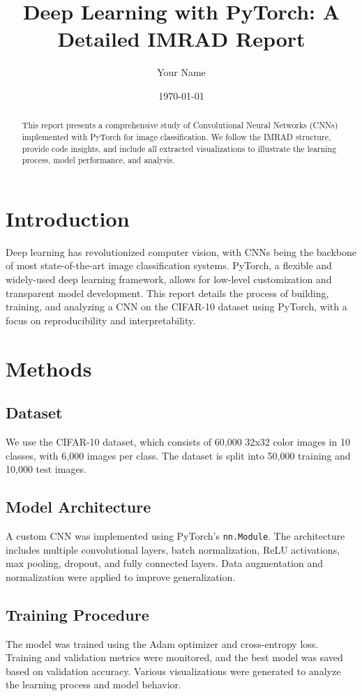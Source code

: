 \documentclass[12pt,a4paper]{article}
\title{Deep Learning with PyTorch: A Detailed IMRAD Report}
\author{Your Name}
\date{\today}
\begin{document}
\maketitle

\begin{abstract}
This report presents a comprehensive study of Convolutional Neural Networks (CNNs) implemented with PyTorch for image classification. We follow the IMRAD structure, provide code insights, and include all extracted visualizations to illustrate the learning process, model performance, and analysis.
\end{abstract}

\section{Introduction}
Deep learning has revolutionized computer vision, with CNNs being the backbone of most state-of-the-art image classification systems. PyTorch, a flexible and widely-used deep learning framework, allows for low-level customization and transparent model development. This report details the process of building, training, and analyzing a CNN on the CIFAR-10 dataset using PyTorch, with a focus on reproducibility and interpretability.

\section{Methods}
\subsection{Dataset}
We use the CIFAR-10 dataset, which consists of 60,000 32x32 color images in 10 classes, with 6,000 images per class. The dataset is split into 50,000 training and 10,000 test images.

\subsection{Model Architecture}
A custom CNN was implemented using PyTorch's \texttt{nn.Module}. The architecture includes multiple convolutional layers, batch normalization, ReLU activations, max pooling, dropout, and fully connected layers. Data augmentation and normalization were applied to improve generalization.

\subsection{Training Procedure}
The model was trained using the Adam optimizer and cross-entropy loss. Training and validation metrics were monitored, and the best model was saved based on validation accuracy. Various visualizations were generated to analyze the learning process and model behavior.
\end{document}
